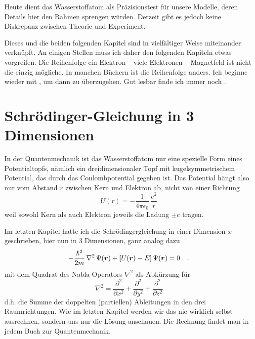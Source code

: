 Heute dient das Wasserstoffatom als Präzisionstest für unsere Modelle, deren Details hier den Rahmen sprengen würden. Derzeit gibt es jedoch keine Diskrepanz zwischen Theorie und Experiment.

Dieses und die beiden folgenden Kapitel sind in vielfältiger Weise miteinander verknüpft. An einigen Stellen muss ich daher den folgenden Kapiteln etwas vorgreifen. Die Reihenfolge ein Elektron -- viele Elektronen -- Magnetfeld ist nicht die einzig mögliche. In manchen Büchern ist die Reihenfolge anders. Ich beginne wieder mit \cite{Knight_Physik}, um dann zu \cite{Demtröder_ep3} überzugehen. Gut lesbar finde ich immer noch \cite{Harris_moderne_Physik}.


\section{Schrödinger-Gleichung in 3 Dimensionen}
In der Quantenmechanik ist das Wasserstoffatom nur eine spezielle Form eines Potentialtopfs, nämlich ein dreidimensionaler Topf mit kugelsymmetrischem Potential, das durch das Coulombpotential gegeben ist. Das Potential hängt also nur vom Abstand $r$ zwischen Kern und Elektron ab, nicht von einer Richtung
\begin{equation}
    U(r) = - \frac{1}{4 \pi \epsilon_0} \, \frac{e^2}{r}
\end{equation}
weil sowohl Kern als auch Elektron jeweils die Ladung $\pm e$ tragen.

Im letzten Kapitel hatte ich die Schrödingergleichung in einer Dimension $x$ geschrieben, hier nun in 3 Dimensionen, ganz analog dazu
\begin{equation}
    - \frac{\hbar^2}{2m} \,\nabla^2 \, \Psi(\boldsymbol{r}) + \left[ U(\boldsymbol{r}) - E \right] \Psi(\boldsymbol{r}) = 0 \quad .
    \label{eq:5_SG_3d}
  \end{equation}
mit dem Quadrat des Nabla-Operators $\nabla^2$ als Abkürzung für
\begin{equation}
    \nabla^2 = \frac{\partial^2}{\partial x^2 } + \frac{\partial^2}{\partial y^2 } + 
    \frac{\partial^2}{\partial z^2 } 
\end{equation}
d.h. die Summe der doppelten (partiellen) Ableitungen in den drei Raumrichtungen. Wie im letzten Kapitel werden wir das nie wirklich selbst ausrechnen, sondern uns nur die Lösung anschauen. Die Rechnung findet man in jedem Buch zur Quantenmechanik.

